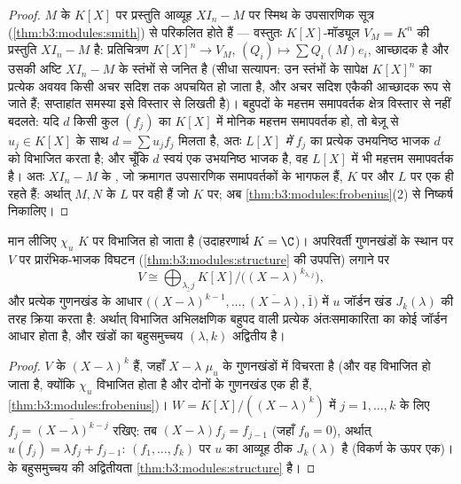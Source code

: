 \begin{proof}
$M$ के  $K[X]$ पर प्रस्तुति आव्यूह $XI_n - M$ पर
स्मिथ के उपसारणिक सूत्र (\cref{thm:b3:modules:smith}) से परिकलित होते हैं --- वस्तुतः
$K[X]$-मॉड्यूल $V_M = K^n$ की प्रस्तुति $XI_n - M$ है: प्रतिचित्रण $K[X]^n \to V_M$,
$(Q_i) \mapsto \sum Q_i(M)e_i$, आच्छादक है और उसकी अष्टि $XI_n - M$ के स्तंभों से जनित है
(सीधा सत्यापन: उन स्तंभों के सापेक्ष $K[X]^n$ का प्रत्येक अवयव किसी
अचर सदिश तक अपचयित हो जाता है, और अचर सदिश एकैकी आच्छादक रूप से
जाते हैं; सप्ताहांत समस्या इसे विस्तार से लिखती है)। बहुपदों के
महत्तम समापवर्तक क्षेत्र विस्तार से नहीं बदलते: यदि $d$ किसी
कुल $(f_j)$ का $K[X]$ में मोनिक महत्तम समापवर्तक हो, तो बेज़ू से
$u_j \in K[X]$ के साथ $d = \sum u_jf_j$ मिलता है, अतः \emph{$L[X]$ में} $f_j$ का
प्रत्येक उभयनिष्ठ भाजक $d$ को विभाजित करता है; और चूँकि $d$
स्वयं एक उभयनिष्ठ भाजक है, वह $L[X]$ में भी महत्तम समापवर्तक है।
अतः $XI_n - M$ के , जो क्रमागत उपसारणिक समापवर्तकों
के भागफल हैं, $K$ पर और $L$ पर एक ही रहते हैं: अर्थात्
$M, N$ के $L$ पर  वही हैं जो $K$ पर; अब
\cref{thm:b3:modules:frobenius}(2) से निष्कर्ष निकालिए।
\end{proof}

\begin{theorem}[जॉर्डन रूप, पुनः व्युत्पन्न]\label{thm:b3:modules:jordan}
मान लीजिए $\chi_u$ $K$ पर विभाजित हो जाता है (उदाहरणार्थ $K = \C$)।
अपरिवर्ती गुणनखंडों के स्थान पर $V$ पर प्रारंभिक-भाजक विघटन
(\cref{thm:b3:modules:structure} की उपपत्ति) लगाने पर
\[
V \cong \bigoplus_{\lambda, j} K[X]\big/\bigl((X -
\lambda)^{k_{\lambda,j}}\bigr),
\]
और प्रत्येक गुणनखंड के आधार $\bigl(\overline{(X-\lambda)^{k-1}}, \dots,
\overline{(X - \lambda)}, \bar 1\bigr)$ में $u$ जॉर्डन खंड $J_k(\lambda)$ की
तरह क्रिया करता है: अर्थात् विभाजित अभिलक्षणिक बहुपद वाली
प्रत्येक अंतःसमाकारिता का कोई जॉर्डन आधार होता है, और खंडों का
बहुसमुच्चय $(\lambda, k)$ अद्वितीय है।
\end{theorem}

\begin{proof}
 $V$ के  $(X - \lambda)^k$ हैं, जहाँ $X - \lambda$
$\mu_u$ के  गुणनखंडों में विचरता है (और वह विभाजित हो
जाता है, क्योंकि $\chi_u$ विभाजित होता है और दोनों के 
गुणनखंड एक ही हैं, \cref{thm:b3:modules:frobenius})। $W = K[X]/((X-\lambda)^k)$ में $j = 1, \dots, k$ के लिए $f_j = \overline{(X - \lambda)^{k-j}}$ रखिए:
तब $(X - \lambda)f_j = f_{j-1}$ (जहाँ $f_0 = 0$), अर्थात् $u(f_j)
= \lambda f_j + f_{j-1}$: $(f_1, \dots,
f_k)$ पर $u$ का आव्यूह
ठीक $J_k(\lambda)$ है (विकर्ण के ऊपर एक)।  के बहुसमुच्चय
की अद्वितीयता \cref{thm:b3:modules:structure} है।
\end{proof}

